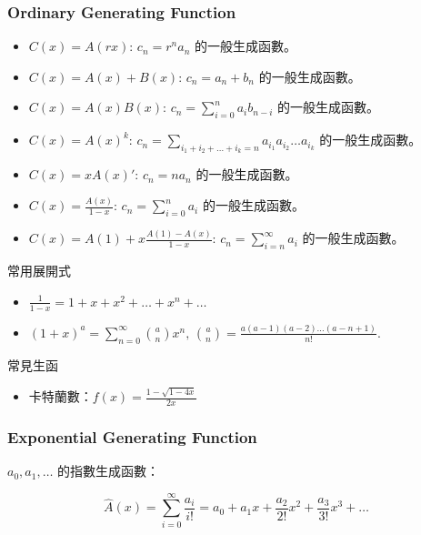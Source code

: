 \subsubsection{Ordinary Generating Function}

\begin{itemize}
    \item $C(x) = A(rx)$: $c_n = r^na_n$ 的一般生成函數。
    \item $C(x) = A(x) + B(x)$: $c_n = a_n + b_n$ 的一般生成函數。
    \item $C(x) = A(x)B(x)$: $c_n = \sum\limits_{i = 0}^n a_ib_{n - i}$ 的一般生成函數。
    \item $C(x) = A(x)^k$: $c_n = \sum\limits_{i_1 + i_2 + \ldots + i_k = n} a_{i_1}a_{i_2} \ldots a_{i_k}$ 的一般生成函數。
    \item $C(x) = xA(x)'$: $c_n = na_n$ 的一般生成函數。
    \item $C(x) = \frac{A(x)}{1 - x}$: $c_n = \sum\limits_{i = 0}^n a_i$ 的一般生成函數。
	\item $C(x) = A(1) + x\frac{A(1) - A(x)}{1-x}$: $c_n = \sum\limits_{i=n}^{\infty} a_i$ 的一般生成函數。
\end{itemize}

常用展開式
\begin{itemize}
    \item $\frac{1}{1 - x} = 1 + x + x^2 + \ldots + x^n + \ldots$
    \item $(1 + x)^a = \sum\limits_{n = 0}^{\infty} \binom{a}{n} x^n, \, \binom{a}{n} = \frac{a(a - 1)(a - 2) \ldots (a - n + 1)}{n!}$.
\end{itemize}

常見生函
\begin{itemize}
	\item 卡特蘭數：$f(x) = \frac{1 - \sqrt{1-4x}}{2x}$
\end{itemize}

\subsubsection{Exponential Generating Function}

$a_0,a_1,\dots$ 的指數生成函數：

\[\hat A(x) = \sum_{i=0}^\infty \frac{a_i}{i!} = a_0 + a_1x + \frac{a_2}{2!}x^2 + \frac{a_3}{3!}x^3 + \dots\]

